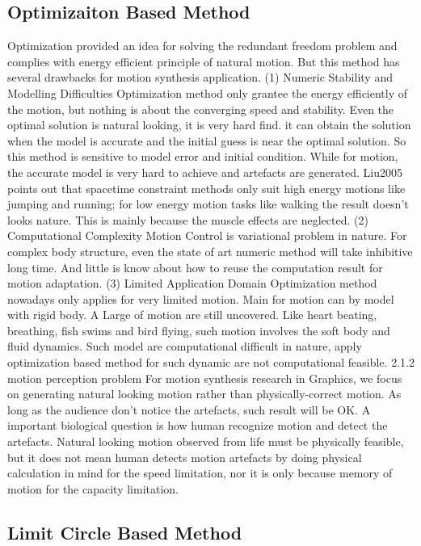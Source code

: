 \subsection{Optimizaiton Based Method}
Optimization provided an idea for solving the redundant freedom problem and complies with energy efficient principle of natural motion.  But this method has several drawbacks for motion synthesis application.
(1) Numeric Stability and Modelling Difficulties
Optimization method only grantee the energy efficiently of the motion, but nothing is about the converging speed and stability. Even the optimal solution is natural looking, it is very hard find.
it can obtain the solution when the model is accurate and the initial guess is near the optimal solution.
So this method is sensitive to model error and initial condition. 
While for motion, the accurate model is very hard to achieve and artefacts are generated.
Liu2005  points out that spacetime constraint methods only suit high energy motions like jumping and running; for low energy motion tasks like walking the result doesn't looks nature. This is mainly because the muscle effects are neglected.
(2) Computational Complexity
Motion Control is variational problem in nature. For complex body structure, even the state of art numeric method will take inhibitive long time. And little is know about how to reuse the computation result for motion adaptation.
(3) Limited Application Domain
Optimization method nowadays only applies for very limited motion. Main for motion can by model with rigid body.
 A Large of motion are still uncovered. Like heart beating, breathing, fish swims and bird flying, such motion involves the soft body and fluid dynamics. Such model are computational difficult in nature, apply optimization based method for such dynamic are not computational feasible.
2.1.2 motion perception problem
For motion synthesis research in Graphics, we focus on generating natural looking motion rather than physically-correct motion. As long as the audience don’t notice the artefacts, such result will be OK. A important biological question is how human recognize motion and detect the artefacts. Natural looking motion observed from life must be physically feasible, but it does not mean human detects motion artefacts by doing physical calculation in mind for the speed limitation, nor it is only because memory of motion for the capacity limitation.
\subsection{Limit Circle Based Method}
